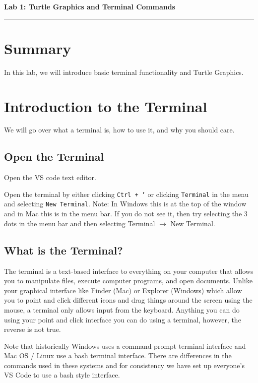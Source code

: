 \documentclass[12pt]{article}
\begin{document}
\begin{center}
  {\Large {\bf Lab 1: Turtle Graphics and Terminal Commands}}
  
\end{center}

\vspace{5pt}
\hrule
\vspace{5pt}

\section{Summary}
In this lab, we will introduce basic terminal functionality and Turtle Graphics.

\section{Introduction to the Terminal}
We will go over what a terminal is, how to use it, and why you should care.

\subsection{Open the Terminal}
Open the VS code text editor.

Open the terminal by either clicking \texttt{Ctrl + `} or clicking \texttt{Terminal} in the menu and selecting \texttt{New Terminal}. Note: In Windows this is at the top of the window and in Mac this is in the menu bar. If you do not see it, then try selecting the 3 dots in the menu bar and then selecting Terminal $\rightarrow$ New Terminal. 

\subsection{What is the Terminal?}
The terminal is a text-based interface to everything on your computer that allows you to manipulate files, execute computer programs, and open documents.
Unlike your graphical interface like Finder (Mac) or Explorer (Windows) which allow you to point and click different icons and drag things around the screen using the mouse, a terminal only allows input from the keyboard.
Anything you can do using your point and click interface you can do using a terminal, however, the reverse is not true.

Note that historically Windows uses a command prompt terminal interface and Mac OS / Linux use a bash terminal interface.
There are differences in the commands used in these systems and for consistency we have set up everyone's VS Code to use a bash style interface. 
\end{document}
